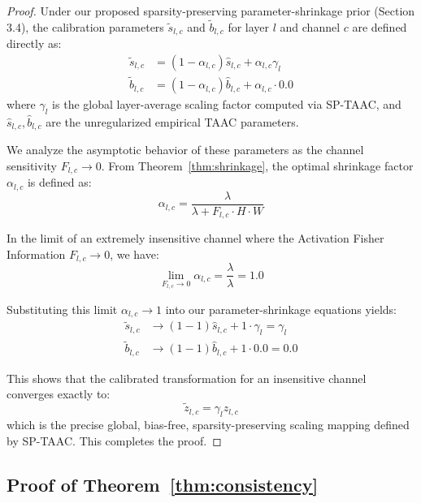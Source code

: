 \documentclass{article}
\theoremstyle{plain}
\theoremstyle{definition}
\theoremstyle{remark}
\begin{document}
\begin{proof}
Under our proposed sparsity-preserving parameter-shrinkage prior (Section 3.4), the calibration parameters $\tilde{s}_{l,c}$ and $\tilde{b}_{l,c}$ for layer $l$ and channel $c$ are defined directly as:
\begin{align}
    \tilde{s}_{l,c} &= (1 - \alpha_{l,c})\hat{s}_{l,c} + \alpha_{l,c} \gamma_l \\
    \tilde{b}_{l,c} &= (1 - \alpha_{l,c})\hat{b}_{l,c} + \alpha_{l,c} \cdot 0.0
\end{align}
where $\gamma_l$ is the global layer-average scaling factor computed via SP-TAAC, and $\hat{s}_{l,c}, \hat{b}_{l,c}$ are the unregularized empirical TAAC parameters.

We analyze the asymptotic behavior of these parameters as the channel sensitivity $F_{l,c} \to 0$. From Theorem~\ref{thm:shrinkage}, the optimal shrinkage factor $\alpha_{l,c}$ is defined as:
\begin{equation}
    \alpha_{l,c} = \frac{\lambda}{\lambda + F_{l,c} \cdot H \cdot W}
\end{equation}

In the limit of an extremely insensitive channel where the Activation Fisher Information $F_{l,c} \to 0$, we have:
\begin{equation}
    \lim_{F_{l,c} \to 0} \alpha_{l,c} = \frac{\lambda}{\lambda} = 1.0
\end{equation}

Substituting this limit $\alpha_{l,c} \to 1$ into our parameter-shrinkage equations yields:
\begin{align}
    \tilde{s}_{l,c} &\to (1 - 1)\hat{s}_{l,c} + 1 \cdot \gamma_l = \gamma_l \\
    \tilde{b}_{l,c} &\to (1 - 1)\hat{b}_{l,c} + 1 \cdot 0.0 = 0.0
\end{align}

This shows that the calibrated transformation for an insensitive channel converges exactly to:
\begin{equation}
    \tilde{z}_{l,c} = \gamma_l z_{l,c}
\end{equation}
which is the precise global, bias-free, sparsity-preserving scaling mapping defined by SP-TAAC. This completes the proof.
\end{proof}

\subsection{Proof of Theorem~\ref{thm:consistency}}
\label{sec:proof_consistency}
\end{document}
